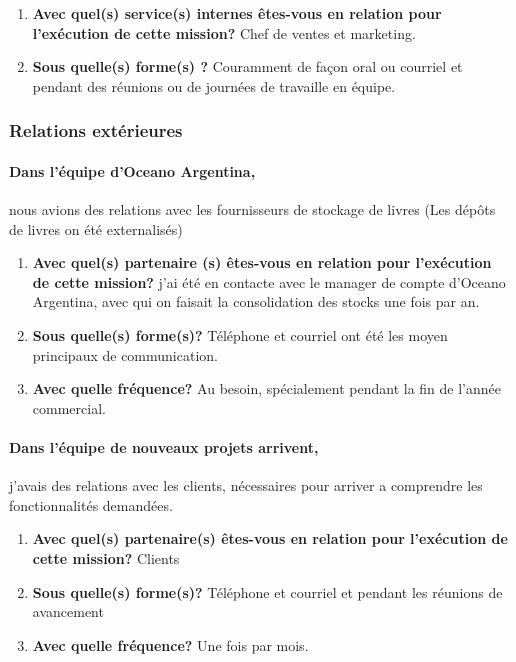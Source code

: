 \documentclass{resume} %
\begin{document}
		\begin{enumerate}
		\item \textbf{Avec quel(s) service(s) internes êtes-vous en relation pour l'exécution de cette mission?}
			Chef de ventes et marketing. 
		\item \textbf{Sous quelle(s) forme(s) ?}
			Couramment de façon oral ou courriel et pendant des réunions ou de journées de travaille en équipe.
		\end{enumerate}

	
	\subsubsection{Relations extérieures} 
		\paragraph{Dans l'équipe d'Oceano Argentina,} nous avions des relations avec les fournisseurs de stockage de livres (Les dépôts de livres on été externalisés)
		\begin{enumerate}
		\item \textbf{Avec quel(s) partenaire (s) êtes-vous en relation pour l'exécution de cette mission?}
			j'ai été en contacte avec le manager de compte d'Oceano Argentina, avec qui on faisait la consolidation des stocks une fois par an.
		\item \textbf{Sous quelle(s) forme(s)?}
			Téléphone et courriel ont été les moyen principaux de communication. 
		\item \textbf{Avec quelle fréquence?}
			Au besoin, spécialement pendant la fin de l'année commercial.
		\end {enumerate}			
		
		\paragraph{Dans l'équipe de nouveaux projets arrivent,} j'avais des relations avec les clients, nécessaires pour arriver a comprendre les fonctionnalités demandées.   
		\begin{enumerate}
		\item \textbf{Avec quel(s) partenaire(s) êtes-vous en relation pour l'exécution de cette mission?}
			Clients
		\item \textbf{ Sous quelle(s) forme(s)?}
			Téléphone et courriel et pendant les réunions de avancement 
		\item \textbf{Avec quelle fréquence?}
			Une fois par mois.
		\end {enumerate}			
		
\end{document}
